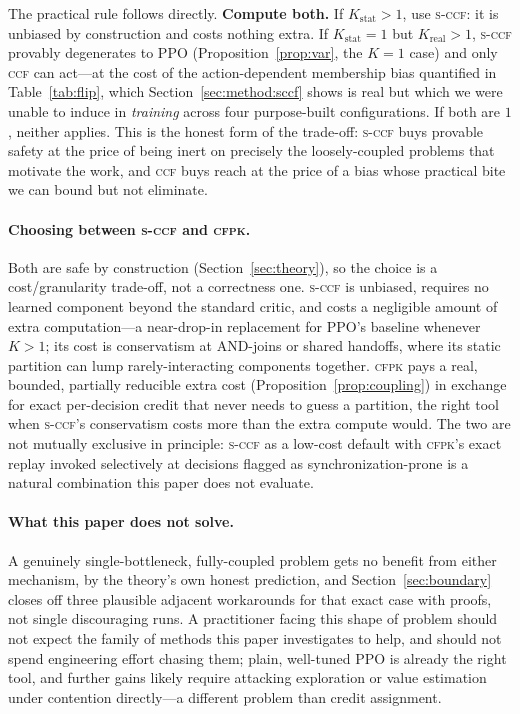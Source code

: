 \documentclass[review,authoryear,3p,times]{elsarticle}
\newcommand{\ccf}{\textsc{ccf}}
\newcommand{\sccf}{\textsc{s-ccf}}
\newcommand{\cfpk}{\textsc{cfpk}}
\newcommand{\Kstat}{K_{\mathrm{stat}}}
\newcommand{\Krea}{K_{\mathrm{real}}}
\begin{document}
The practical rule follows directly. \textbf{Compute both.} If
$\Kstat>1$, use \sccf: it is unbiased by construction and costs nothing extra.
If $\Kstat=1$ but $\Krea>1$, \sccf{} provably degenerates to PPO
(Proposition~\ref{prop:var}, the $K{=}1$ case) and only \ccf{} can act---at the cost of the
action-dependent membership bias quantified in Table~\ref{tab:flip}, which
Section~\ref{sec:method:sccf} shows is real but which we were unable to induce
in \emph{training} across four purpose-built configurations. If both are $1$,
neither applies. This is the honest form of the trade-off: \sccf{} buys
provable safety at the price of being inert on precisely the loosely-coupled
problems that motivate the work, and \ccf{} buys reach at the price of a bias
whose practical bite we can bound but not eliminate.

\paragraph{Choosing between \sccf{} and \cfpk.} Both are safe by construction
(Section~\ref{sec:theory}), so the choice is a cost/granularity trade-off,
not a correctness one. \sccf{} is unbiased, requires no learned component
beyond the standard critic, and costs a negligible amount of extra
computation---a near-drop-in replacement for PPO's baseline whenever $K>1$;
its cost is conservatism at AND-joins or shared handoffs, where its static
partition can lump rarely-interacting components together. \cfpk{} pays a
real, bounded, partially reducible extra cost (Proposition~\ref{prop:coupling})
in exchange for exact per-decision credit that never needs to guess a
partition, the right tool when \sccf's conservatism costs more than the
extra compute would. The two are not mutually exclusive in principle: \sccf{}
as a low-cost default with \cfpk's exact replay invoked selectively at
decisions flagged as synchronization-prone is a natural combination this
paper does not evaluate.

\paragraph{What this paper does not solve.} A genuinely single-bottleneck,
fully-coupled problem gets no benefit from either mechanism, by the theory's
own honest prediction, and Section~\ref{sec:boundary} closes off three
plausible adjacent workarounds for that exact case with proofs, not single
discouraging runs. A practitioner facing this shape of problem should not
expect the family of methods this paper investigates to help, and should not
spend engineering effort chasing them; plain, well-tuned PPO is already the
right tool, and further gains likely require attacking exploration or value
estimation under contention directly---a different problem than credit
assignment.
\end{document}
